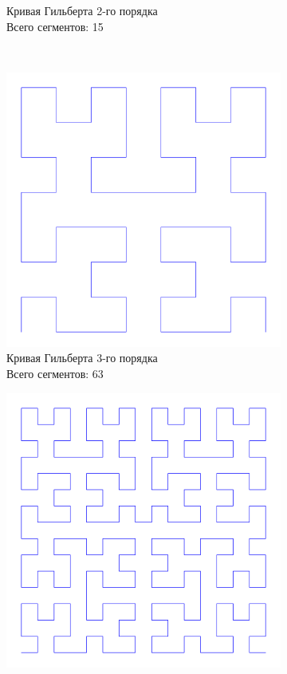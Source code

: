 \begin{figure}[H]
\begin{subfigure}{0.42\textwidth}
        \caption{Кривая Гильберта 2-го порядка \\ Всего сегментов: 15}
    \end{subfigure}
    \\
    \begin{subfigure}{0.42\textwidth}
        \includegraphics[width=\textwidth]{plots/hilbert_curve_level3.png}
        \caption{Кривая Гильберта 3-го порядка \\ Всего сегментов: 63}
    \end{subfigure}
    \hfill
    \begin{subfigure}{0.42\textwidth}
        \includegraphics[width=\textwidth]{plots/hilbert_curve_level4.png}

\end{subfigure}
\end{figure}
